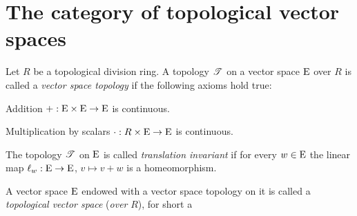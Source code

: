 %
\section{The category of topological vector spaces}
\label{sec:vector-space-topologies-local-convexity}

\begin{definition}
  \label{def:topological-vector-space}
   Let $R$ be a topological division ring. 
   A topology $\mathscr{T}$ on  a vector space  $\mathrm{E}$  over $R$ 
   is called a \emph{vector space topology} if the following axioms hold true:
   \begin{axiomlist}[TVS]
   \item\label{axiom:tvs-continuity-addition}
     Addition $+ : \mathrm{E} \times \mathrm{E} \to \mathrm{E}$ is continuous.
   \item\label{axiom:tvs-continuity-multiplication-scalars} 
     Multiplication by scalars  $\cdot : R \times \mathrm{E} \to \mathrm{E}$ is 
     continuous.
   \end{axiomlist}
   The topology $\mathscr{T}$ on $\mathrm{E}$ is called \emph{translation invariant}
   if for every $w\in \mathrm{E}$ the linear map 
   $\ell_{w} : \mathrm{E} \to \mathrm{E}$, $v\mapsto v +w$ is a homeomorphism.

   A vector space  $\mathrm{E}$ endowed with a vector space topology on it
   is called a \emph{topological vector space} (\emph{over} $R$), for short a \tvs
\end{definition}


